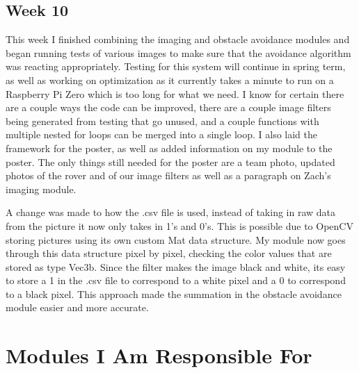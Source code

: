 \documentclass[10pt,letterpaper,onecolumn,draftclsnofoot,journal]{IEEEtran}
\begin{document}
\subsection{Week 10}
This week I finished combining the imaging and obstacle avoidance modules and began running tests of various images to make sure that the avoidance algorithm was reacting appropriately. Testing for this system will continue in spring term, as well as working on optimization as it currently takes a minute to run on a Raspberry Pi Zero which is too long for what we need. I know for certain there are a couple ways the code can be improved, there are a couple image filters being generated from testing that go unused, and a couple functions with multiple nested for loops can be merged into a single loop. I also laid the framework for the poster, as well as added information on my module to the poster. The only things still needed for the poster are a team photo, updated photos of the rover and of our image filters as well as a paragraph on Zach's imaging module.
\par
A change was made to how the .csv file is used, instead of taking in raw data from the picture it now only takes in 1's and 0's. This is possible due to OpenCV storing pictures using its own custom Mat data structure. My module now goes through this data structure pixel by pixel, checking the color values that are stored as type Vec3b. Since the filter makes the image black and white, its easy to store a 1 in the .csv file to correspond to a white pixel and a 0 to correspond to a black pixel. This approach made the summation in the obstacle avoidance module easier and more accurate.


\section{Modules I Am Responsible For}
\end{document}
